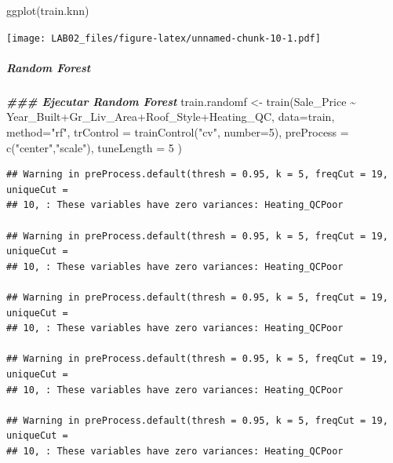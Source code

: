 \documentclass[
]{article}
\newenvironment{Shaded}{\begin{snugshade}}{\end{snugshade}}
\newcommand{\AttributeTok}[1]{\textcolor[rgb]{0.77,0.63,0.00}{#1}}
\newcommand{\DecValTok}[1]{\textcolor[rgb]{0.00,0.00,0.81}{#1}}
\newcommand{\DocumentationTok}[1]{\textcolor[rgb]{0.56,0.35,0.01}{\textbf{\textit{#1}}}}
\newcommand{\FunctionTok}[1]{\textcolor[rgb]{0.00,0.00,0.00}{#1}}
\newcommand{\NormalTok}[1]{#1}
\newcommand{\OtherTok}[1]{\textcolor[rgb]{0.56,0.35,0.01}{#1}}
\newcommand{\SpecialCharTok}[1]{\textcolor[rgb]{0.00,0.00,0.00}{#1}}
\newcommand{\StringTok}[1]{\textcolor[rgb]{0.31,0.60,0.02}{#1}}
\begin{document}
\begin{Shaded}
\begin{Highlighting}[]
\FunctionTok{ggplot}\NormalTok{(train.knn)}
\end{Highlighting}
\end{Shaded}

\texttt{[image: LAB02\_files/figure-latex/unnamed-chunk-10-1.pdf]}

\begin{Shaded}
\end{Shaded}

\hypertarget{random-forest-1}{%
\subparagraph{Random Forest}\label{random-forest-1}}

\begin{Shaded}
\begin{Highlighting}[]
\DocumentationTok{\#\#\# Ejecutar Random Forest}
\NormalTok{train.randomf }\OtherTok{\textless{}{-}} \FunctionTok{train}\NormalTok{(Sale\_Price }\SpecialCharTok{\textasciitilde{}}\NormalTok{ Year\_Built}\SpecialCharTok{+}\NormalTok{Gr\_Liv\_Area}\SpecialCharTok{+}\NormalTok{Roof\_Style}\SpecialCharTok{+}\NormalTok{Heating\_QC, }
                       \AttributeTok{data=}\NormalTok{train, }\AttributeTok{method=}\StringTok{"rf"}\NormalTok{,  }
                       \AttributeTok{trControl =} \FunctionTok{trainControl}\NormalTok{(}\StringTok{"cv"}\NormalTok{, }\AttributeTok{number=}\DecValTok{5}\NormalTok{),}
                       \AttributeTok{preProcess =} \FunctionTok{c}\NormalTok{(}\StringTok{"center"}\NormalTok{,}\StringTok{"scale"}\NormalTok{),}
                       \AttributeTok{tuneLength =} \DecValTok{5} 
\NormalTok{)}
\end{Highlighting}
\end{Shaded}

\begin{verbatim}
## Warning in preProcess.default(thresh = 0.95, k = 5, freqCut = 19, uniqueCut =
## 10, : These variables have zero variances: Heating_QCPoor

## Warning in preProcess.default(thresh = 0.95, k = 5, freqCut = 19, uniqueCut =
## 10, : These variables have zero variances: Heating_QCPoor

## Warning in preProcess.default(thresh = 0.95, k = 5, freqCut = 19, uniqueCut =
## 10, : These variables have zero variances: Heating_QCPoor

## Warning in preProcess.default(thresh = 0.95, k = 5, freqCut = 19, uniqueCut =
## 10, : These variables have zero variances: Heating_QCPoor

## Warning in preProcess.default(thresh = 0.95, k = 5, freqCut = 19, uniqueCut =
## 10, : These variables have zero variances: Heating_QCPoor
\end{verbatim}
\end{document}
